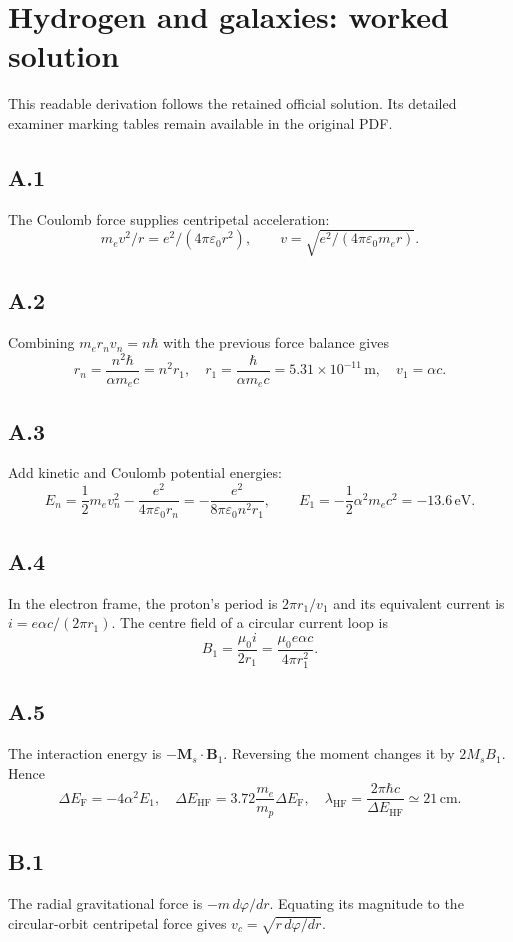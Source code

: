 \documentclass{article}
\begin{document}
\section*{Hydrogen and galaxies: worked solution}
This readable derivation follows the retained official solution. Its detailed examiner marking tables remain available in the original PDF.
\subsection*{A.1}
The Coulomb force supplies centripetal acceleration:
\[m_e v^2/r=e^2/(4\pi\varepsilon_0r^2),\qquad v=\sqrt{e^2/(4\pi\varepsilon_0m_er)}.\]
\subsection*{A.2}
Combining $m_e r_n v_n=n\hbar$ with the previous force balance gives
\[r_n=\frac{n^2\hbar}{\alpha m_ec}=n^2r_1,\quad r_1=\frac{\hbar}{\alpha m_ec}=5.31\times10^{-11}\,\mathrm m,\quad v_1=\alpha c.\]
\subsection*{A.3}
Add kinetic and Coulomb potential energies:
\[E_n=\frac12m_ev_n^2-\frac{e^2}{4\pi\varepsilon_0r_n}=-\frac{e^2}{8\pi\varepsilon_0n^2r_1},\qquad E_1=-\frac12\alpha^2m_ec^2=-13.6\,\mathrm{eV}.\]
\subsection*{A.4}
In the electron frame, the proton's period is $2\pi r_1/v_1$ and its equivalent current is $i=e\alpha c/(2\pi r_1)$. The centre field of a circular current loop is
\[B_1=\frac{\mu_0i}{2r_1}=\frac{\mu_0e\alpha c}{4\pi r_1^2}.\]
\subsection*{A.5}
The interaction energy is $-\mathbf M_s\cdot\mathbf B_1$. Reversing the moment changes it by $2M_sB_1$. Hence
\[\Delta E_{\mathrm F}=-4\alpha^2E_1,\quad \Delta E_{\mathrm{HF}}=3.72\frac{m_e}{m_p}\Delta E_{\mathrm F},\quad \lambda_{\mathrm{HF}}=\frac{2\pi\hbar c}{\Delta E_{\mathrm{HF}}}\simeq21\,\mathrm{cm}.\]
\subsection*{B.1}
The radial gravitational force is $-m\,d\varphi/dr$. Equating its magnitude to the circular-orbit centripetal force gives $v_c=\sqrt{r\,d\varphi/dr}$.
\end{document}
